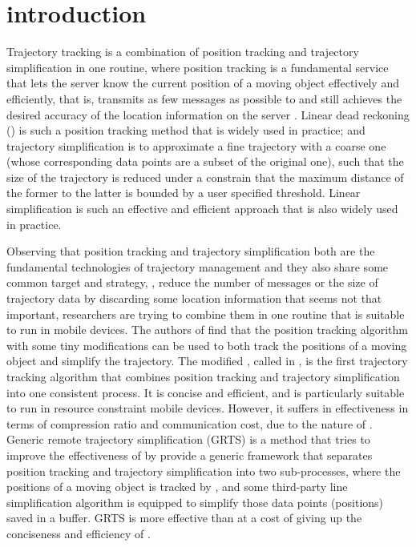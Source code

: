 

\section{introduction}
\label{sec-intro}


Trajectory tracking \cite{Lange:Tracking} is a combination of position tracking \cite{Wolfson:PositionTracking,Leonhardi:Comparison} and trajectory simplification in one routine, 
where position tracking is a fundamental service that lets the server know the current position of a moving object effectively and efficiently, that is, transmits as few messages
as possible to and still achieves the desired accuracy of the location information on the server \cite{Leonhardi:Comparison}. Linear dead reckoning (\ldr) \cite{Wolfson:PositionTracking} is such a position tracking method that is widely used in practice;
%
and trajectory simplification is to approximate a fine trajectory with a coarse one (whose corresponding data points are a subset of the original one), such that the size of the trajectory is reduced under a constrain that the maximum distance of the former to the latter is bounded by a user specified threshold. Linear simplification is such an effective and efficient approach that is also widely used in practice.

Observing that position tracking and trajectory simplification both are the fundamental technologies of trajectory management and they also share some common target and strategy, \ie, reduce the number of messages or the size of trajectory data by discarding some location information that seems not that important, researchers are trying to combine them in one routine that is suitable to run in mobile devices.
%
The authors of \cite{Trajcevski:LDRH} find that the position tracking algorithm \ldr with some tiny modifications can be used to both track the positions of a moving object and simplify the trajectory. The modified \ldr,  called \ldrh in \cite{Lange:Tracking}, is the first trajectory tracking algorithm that combines position tracking and trajectory simplification into one consistent process. It is concise and efficient, and is particularly suitable to run in resource constraint mobile devices. However, it suffers in effectiveness in terms of compression ratio and communication cost, due to the nature of \ldr. 
%
Generic remote trajectory simplification (GRTS) \cite{Lange:GRTS,Lange:Tracking} is a method that tries to improve the effectiveness of \ldrh by provide a generic framework that separates position tracking and trajectory simplification into two sub-processes, where the positions of a moving object is tracked by \ldr, and some third-party line simplification algorithm is equipped to simplify those data points (positions) saved in a buffer. GRTS is more effective than \ldrh at a cost of giving up the conciseness and efficiency of \ldrh.
%



